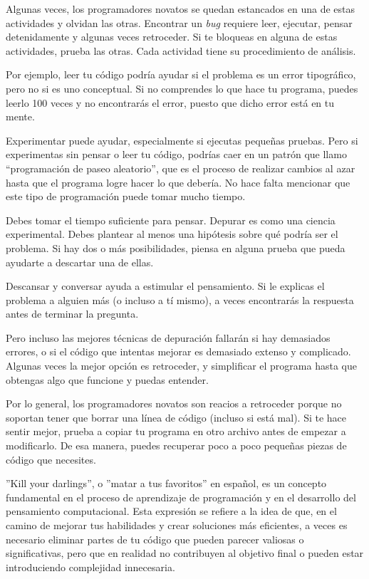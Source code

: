 Algunas veces, los programadores novatos se quedan estancados en una de
estas actividades y olvidan las otras. Encontrar un \emph{bug} requiere
leer, ejecutar, pensar detenidamente y algunas veces retroceder. Si te
bloqueas en alguna de estas actividades, prueba las otras. Cada
actividad tiene su procedimiento de análisis.


Por ejemplo, leer tu código podría ayudar si el problema es un error
tipográfico, pero no si es uno conceptual. Si no comprendes lo que hace
tu programa, puedes leerlo 100 veces y no encontrarás el error, puesto
que dicho error está en tu mente.


Experimentar puede ayudar, especialmente si ejecutas pequeñas pruebas.
Pero si experimentas sin pensar o leer tu código, podrías caer en un
patrón que llamo ``programación de paseo aleatorio'', que es el proceso
de realizar cambios al azar hasta que el programa logre hacer lo que
debería. No hace falta mencionar que este tipo de programación puede
tomar mucho tiempo.


Debes tomar el tiempo suficiente para pensar. Depurar es como una
ciencia experimental. Debes plantear al menos una hipótesis sobre qué
podría ser el problema. Si hay dos o más posibilidades, piensa en alguna
prueba que pueda ayudarte a descartar una de ellas.

Descansar y conversar ayuda a estimular el pensamiento. Si le explicas
el problema a alguien más (o incluso a tí mismo), a veces encontrarás la
respuesta antes de terminar la pregunta.

Pero incluso las mejores técnicas de depuración fallarán si hay
demasiados errores, o si el código que intentas mejorar es demasiado
extenso y complicado. Algunas veces la mejor opción es retroceder, y
simplificar el programa hasta que obtengas algo que funcione y puedas
entender.

Por lo general, los programadores novatos son reacios a retroceder
porque no soportan tener que borrar una línea de código (incluso si está
mal). Si te hace sentir mejor, prueba a copiar tu programa en otro
archivo antes de empezar a modificarlo. De esa manera, puedes recuperar
poco a poco pequeñas piezas de código que necesites.

''Kill your darlings'', o ''matar a tus favoritos'' en español, es un concepto fundamental en el proceso de aprendizaje de programación y en el desarrollo del pensamiento computacional. Esta expresión se refiere a la idea de que, en el camino de mejorar tus habilidades y crear soluciones más eficientes, a veces es necesario eliminar partes de tu código que pueden parecer valiosas o significativas, pero que en realidad no contribuyen al objetivo final o pueden estar introduciendo complejidad innecesaria.

